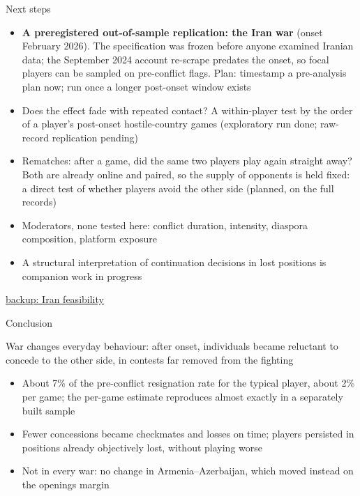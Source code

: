 \documentclass[aspectratio=169,11pt,t]{beamer}
\newcommand{\bk}[2]{\hyperlink{#1}{\textcolor{linkblue}{\scriptsize\textsf{backup: #2}}}}
\newcommand{\links}[1]{\vfill\hfill{#1}}
\begin{document}
\begin{frame}[label=nextsteps]{Next steps}
  \small
  \begin{itemize}
    \item \textbf{A preregistered out-of-sample replication: the Iran war} (onset February 2026). The specification was frozen before anyone examined Iranian data; the September 2024 account re-scrape predates the onset, so focal players can be sampled on pre-conflict flags. Plan: timestamp a pre-analysis plan now; run once a longer post-onset window exists
    \item Does the effect fade with repeated contact? A within-player test by the order of a player's post-onset hostile-country games (exploratory run done; raw-record replication pending)
    \item Rematches: after a game, did the same two players play again straight away? Both are already online and paired, so the supply of opponents is held fixed: a direct test of whether players avoid the other side (planned, on the full records)
    \item Moderators, none tested here: conflict duration, intensity, diaspora composition, platform exposure
    \item A structural interpretation of continuation decisions in lost positions is companion work in progress
  \end{itemize}
  \links{\bk{bk-iran}{Iran feasibility}}
\end{frame}

\begin{frame}{Conclusion}
  \small
  \begin{block}{}
    War changes everyday behaviour: after onset, individuals became reluctant to concede to the other side, in contests far removed from the fighting
  \end{block}
  \vspace{2mm}
  \begin{itemize}
    \item About 7\% of the pre-conflict resignation rate for the typical player, about 2\% per game; the per-game estimate reproduces almost exactly in a separately built sample
    \item Fewer concessions became checkmates and losses on time; players persisted in positions already objectively lost, without playing worse
    \item Not in every war: no change in Armenia--Azerbaijan, which moved instead on the openings margin
  \end{itemize}
\end{frame}
\end{document}
